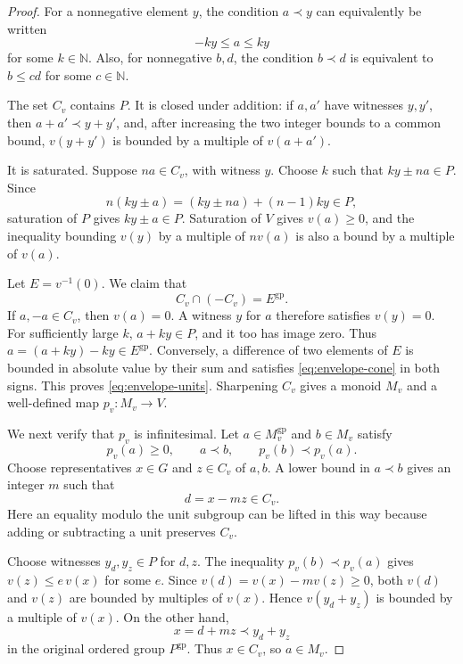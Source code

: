 \documentclass[11pt]{article}
\theoremstyle{definition}
\theoremstyle{remark}
\newcommand{\gp}{\mathrm{gp}}
\newcommand{\NN}{\mathbb N}
\begin{document}
\begin{proof}
For a nonnegative element \(y\), the condition \(a\prec y\) can
equivalently be written
\[
-ky\le a\le ky
\]
for some \(k\in\NN\). Also, for nonnegative \(b,d\), the condition
\(b\prec d\) is equivalent to \(b\le cd\) for some \(c\in\NN\).

The set \(C_v\) contains \(P\). It is closed under addition: if
\(a,a'\) have witnesses \(y,y'\), then \(a+a'\prec y+y'\), and,
after increasing the two integer bounds to a common bound,
\(v(y+y')\) is bounded by a multiple of \(v(a+a')\).

It is saturated. Suppose \(na\in C_v\), with witness \(y\).
Choose \(k\) such that \(ky\pm na\in P\). Since
\[
n(ky\pm a)=(ky\pm na)+(n-1)ky\in P,
\]
saturation of \(P\) gives \(ky\pm a\in P\).
Saturation of \(V\) gives \(v(a)\ge0\), and the inequality bounding
\(v(y)\) by a multiple of \(nv(a)\) is also a bound by a multiple of
\(v(a)\).

Let \(E=v^{-1}(0)\). We claim that
\begin{equation}\label{eq:envelope-units}
C_v\cap(-C_v)=E^{\gp}.
\end{equation}
If \(a,-a\in C_v\), then \(v(a)=0\). A witness \(y\) for \(a\)
therefore satisfies \(v(y)=0\). For sufficiently large \(k\),
\(a+ky\in P\), and it too has image zero. Thus
\(a=(a+ky)-ky\in E^{\gp}\).
Conversely, a difference of two elements of \(E\) is bounded in
absolute value by their sum and satisfies
\eqref{eq:envelope-cone} in both signs. This proves
\eqref{eq:envelope-units}. Sharpening \(C_v\) gives a monoid \(M_v\)
and a well-defined map \(p_v:M_v\to V\).

We next verify that \(p_v\) is infinitesimal. Let
\(a\in M_v^{\gp}\) and \(b\in M_v\) satisfy
\[
p_v(a)\ge0,\qquad a\prec b,\qquad p_v(b)\prec p_v(a).
\]
Choose representatives \(x\in G\) and \(z\in C_v\) of \(a,b\).
A lower bound in \(a\prec b\) gives an integer \(m\) such that
\[
d=x-mz\in C_v.
\]
Here an equality modulo the unit subgroup can be lifted in this
way because adding or subtracting a unit preserves \(C_v\).

Choose witnesses \(y_d,y_z\in P\) for \(d,z\). The inequality
\(p_v(b)\prec p_v(a)\) gives \(v(z)\le e\,v(x)\) for some \(e\).
Since \(v(d)=v(x)-m v(z)\ge0\), both \(v(d)\) and \(v(z)\) are
bounded by multiples of \(v(x)\). Hence
\(v(y_d+y_z)\) is bounded by a multiple of \(v(x)\).
On the other hand,
\[
x=d+mz\prec y_d+y_z
\]
in the original ordered group \(P^{\gp}\).
Thus \(x\in C_v\), so \(a\in M_v\).


\end{proof}
\end{document}
